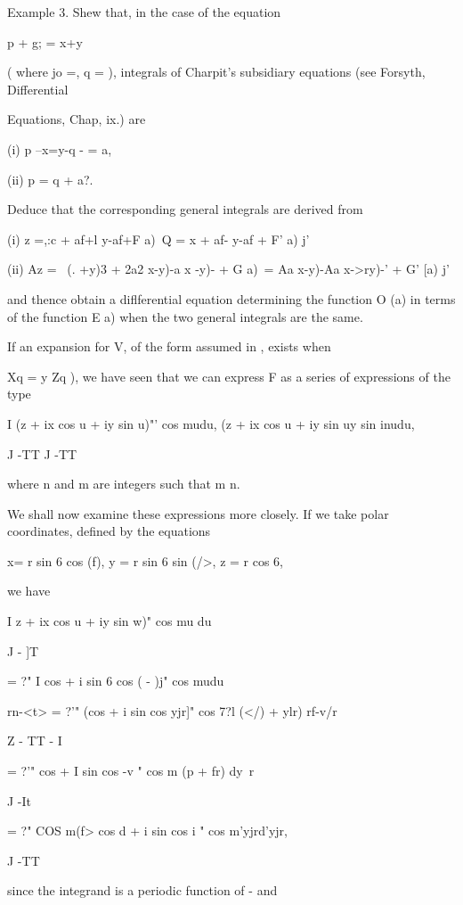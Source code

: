 Example 3. Shew that, in the case of the equation

p + g; = x+y

( where jo =, q = ), integrals of Charpit's subsidiary equations (see
Forsyth, Differential

Equations, Chap, ix.) are

(i) p --x=y-q - = a,

(ii) p = q + a?.

Deduce that the corresponding general integrals are derived from

(i) z =,:c + af+l y-af+F a)\ Q = x + af- y-af + F' a) j'

(ii) Az = \ (. +y)3 + 2a2 x-y)-a x -y)- + G a)\ = Aa x-y)-Aa x->ry)-'
+ G' [a) j'

and thence obtain a diflferential equation determining the function O
(a) in terms of the function E a) when the two general integrals are
the same.

If an expansion for V, of the form assumed in , exists when

Xq = y Zq ), we have seen that we can express F as a series of
expressions of the type

I (z + ix cos u + iy sin u)"' cos mudu, (z + ix cos u + iy sin uy sin
inudu,

J -TT J -TT

where n and m are integers such that m n.

We shall now examine these expressions more closely. If we take polar
coordinates, defined by the equations

x= r sin 6 cos (f), y = r sin 6 sin (/>, z = r cos 6,

%
%

we have

I z + ix cos u + iy sin w)" cos mu du

J - ]T

= ?" I cos + i sin 6 cos ( - )j" cos mudu

rn-<t> = ?'" (cos + i sin cos yjr]" cos 7?l (</) + ylr) rf-v/r

Z - TT - I

= ?'" cos + I sin cos -v " cos m (p + fr) dy\ r

J -It

= ?" COS m(f> cos d + i sin cos i " cos m'yjrd'yjr,

J -TT

since the integrand is a periodic function of - and

